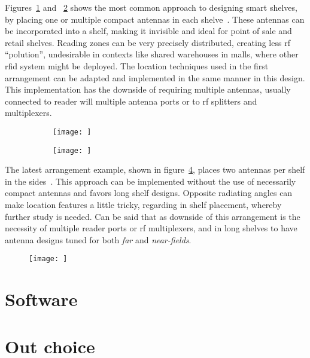 Figures~\ref{fig:position2} and ~\ref{fig:position3} shows the most common approach to designing smart shelves, by placing one or multiple compact antennas in each shelve~\cite{markakisSafeEfficientDesign2014}.
These antennas can be incorporated into a shelf, making it invisible and ideal for point of sale and retail shelves.
Reading zones can be very precisely distributed, creating less \ac{rf} ``polution'', undesirable in contexts like shared warehouses in malls, where other \ac{rfid} system might be deployed.
The location techniques used in the first arrangement can be adapted and implemented in the same manner in this design.
This implementation has the downside of requiring multiple antennas, usually connected to reader will multiple antenna ports or to \ac{rf} splitters and multiplexers.

\begin{figure}[!ht]
    \centering
    \begin{subfigure}{.45\textwidth}
        \centering
        \texttt{[image: ]}
        \caption{} 
        \label{fig:position2}
    \end{subfigure}
    \begin{subfigure}{.45\textwidth}
        \centering
        \texttt{[image: ]}
        \caption{} 
        \label{fig:position3}
    \end{subfigure}
    \caption{} 
    \label{fig:}
\end{figure}

The latest arrangement example, shown in figure~\ref{fig:position4}, places two antennas per shelf in the sides~\cite{markakisRFIDenabledLibraryManagement2013}. This approach can be implemented without the use of necessarily compact antennas and favors long shelf designs.
Opposite radiating angles can make location features a little tricky, regarding in shelf placement, whereby further study is needed.
Can be said that as downside of this arrangement is the necessity of multiple reader ports or \ac{rf} multiplexers, and in long shelves to have antenna designs tuned for both \emph{far} and \emph{near-fields}.

\begin{figure}[!ht]
    \centering
    \texttt{[image: ]}
    \caption{} 
    \label{fig:position4}
\end{figure}

\section{Software}

\section{Out choice} \label{sec:ourchoice}
